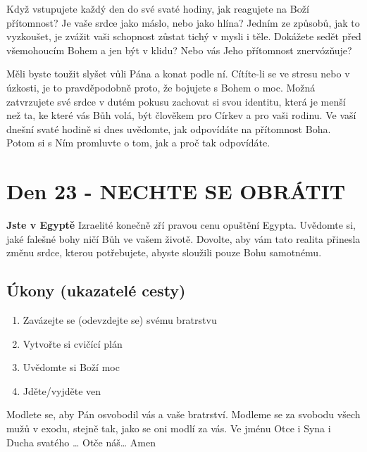 \documentclass[11pt]{article}
\newcommand{\zacatekCtvrtyTyden}{
  \textbf{Jste v Egyptě} \newline
  Izraelité konečně zří pravou cenu opuštění Egypta. Uvědomte si, jaké falešné bohy ničí Bůh ve vašem životě.
Dovolte, aby vám tato realita přinesla změnu srdce, kterou potřebujete, abyste sloužili pouze Bohu samotnému.

\subsection*{Úkony (ukazatelé cesty)}
\begin{enumerate}
  \item Zavázejte se (odevzdejte se) svému bratrstvu
  \item Vytvořte si cvičící plán
  \item Uvědomte si Boží moc
  \item Jděte/vyjděte ven
\end{enumerate}
Modlete se, aby Pán osvobodil vás a vaše bratrství. \newline
Modleme se za svobodu všech mužů v exodu, stejně tak, jako se oni modlí za vás.\newline
Ve jménu Otce i Syna i Ducha svatého …  Otče náš… Amen
}
\begin{document}
Když vstupujete každý den do své svaté hodiny, jak reagujete na Boží přítomnost? Je vaše srdce jako máslo, nebo
jako hlína? Jedním ze způsobů, jak to vyzkoušet, je zvážit vaši schopnost zůstat tichý v mysli i těle. Dokážete sedět
před všemohoucím Bohem a jen být v klidu? Nebo vás Jeho přítomnost znervózňuje?

Měli byste toužit slyšet vůli Pána a konat podle ní. Cítíte-li se ve stresu nebo v úzkosti, je to pravděpodobně proto,
že bojujete s Bohem o moc. Možná zatvrzujete své srdce v dutém pokusu zachovat si svou identitu, která je menší
než ta, ke které vás Bůh volá, být člověkem pro Církev a pro vaši rodinu. Ve vaší dnešní svaté hodině si dnes
uvědomte, jak odpovídáte na přítomnost Boha. Potom si s Ním promluvte o tom, jak a proč tak odpovídáte.

\newpage
\section{Den 23 - NECHTE SE OBRÁTIT}
\zacatekCtvrtyTyden
\end{document}
